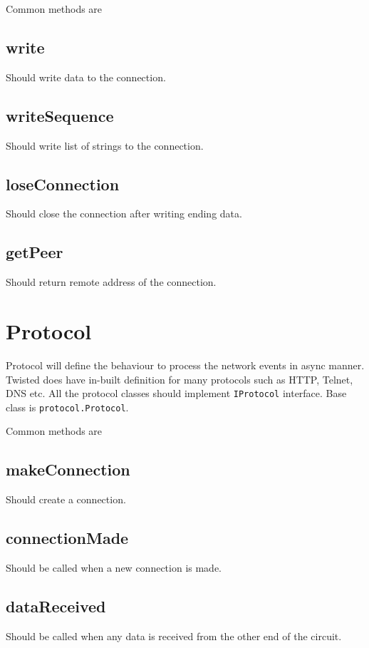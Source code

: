 \documentclass{article}
\begin{document}
    Common methods are

    \subsection{write} Should write data to the connection.

    \subsection {writeSequence} Should write list of strings to the connection.

    \subsection{loseConnection} Should close the connection after writing
    ending data.

    \subsection{getPeer} Should return remote address of the connection.

  \section{Protocol}
    Protocol will define the behaviour to process the network events in async
    manner. Twisted does have in-built definition for many protocols such as
    HTTP, Telnet, DNS etc. All the protocol classes should implement
    \texttt{IProtocol} interface. Base class is \texttt{protocol.Protocol}.

    Common methods are

    \subsection{makeConnection} Should create a connection.

    \subsection{connectionMade} Should be called when a new connection is made.

    \subsection{dataReceived} Should be called when any data is received from
    the other end of the circuit.
\end{document}
